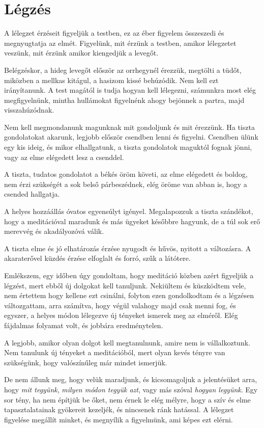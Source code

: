 \hypertarget{luxe9gzuxe9s-1}{%
\chapter{Légzés}\label{luxe9gzuxe9s-1}}

A lélegzet érzéseit figyeljük a testben, ez az éber figyelem összeszedi
és megnyugtatja az elmét. Figyelünk, mit érzünk a testben, amikor
lélegzetet veszünk, mit érzünk amikor kiengedjük a levegőt.

Belégzéskor, a hideg levegőt először az orrhegynél érezzük, megtölti a
tüdőt, miközben a mellkas kitágul, a hasizom kissé behúzódik. Nem kell
ezt irányítanunk. A test magától is tudja hogyan kell lélegezni,
számunkra most elég megfigyelnünk, mintha hullámokat figyelnénk ahogy
bejönnek a partra, majd visszahúzódnak.

Nem kell megmondanunk magunknak mit gondoljunk és mit érezzünk. Ha
tiszta gondolatokat akarunk, legjobb először csendben lenni és figyelni.
Csendben ülünk egy kis ideig, és mikor elhallgatunk, a tiszta gondolatok
maguktól fognak jönni, vagy az elme elégedett lesz a csenddel.

A tiszta, tudatos gondolatot a békés öröm követi, az elme elégedett és
boldog, nem érzi szükségét a sok belső párbeszédnek, elég öröme van
abban is, hogy a csended hallgatja.

A helyes hozzáállás óvatos egyensúlyt igényel. Megalapozzuk a tiszta
szándékot, hogy a meditációval maradunk és más ügyeket későbbre hagyunk,
de a túl sok erő merevvég és akadályozóvá válik.

A tiszta elme és jó elhatározás érzése nyugodt és hűvös, nyitott a
változásra. A akaraterővel küzdés érzése elfoglalt és forró, szűk a
látótere.

Emlékszem, egy időben úgy gondoltam, hogy meditáció közben azért
figyeljük a légzést, mert ebből új dolgokat kell tanuljunk. Nekiültem és
küszködtem vele, nem értettem hogy kellene ezt csinálni, folyton ezen
gondolkodtam és a légzésen változgattam, arra számítva, hogy végül
valahogy majd csak menni fog, és egyszer, a helyes módon lélegezve új
tényeket ismerek meg az elméről. Elég fájdalmas folyamat volt, és
jobbára eredménytelen.

A legjobb, amikor olyan dolgot kell megtanulnunk, amire nem is
vállalkoztunk. Nem tanulunk új tényeket a meditációból, mert olyan kevés
tényre van szükségünk, hogy valószínűleg már mindet ismerjük.

De nem állunk meg, hogy velük maradjunk, és kicsomagoljuk a jelentésüket
arra, hogy \emph{mit tegyünk}, \emph{milyen módon tegyük azt}, vagy más
szóval \emph{hogyan legyünk}. Egy sor tény, ha nem építjük be őket, nem
érnek le elég mélyre, hogy a szív és elme tapasztalatainak gyökereit
kezeljék, és nincsenek ránk hatással. A lélegzet figyelése megállít
minket, és megnyílik a figyelmünk, ami képes ezt elérni.

